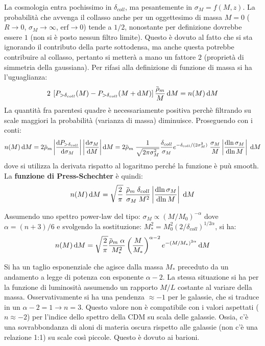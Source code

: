 La cosmologia entra pochissimo in $\delta_{coll}$, ma pesantemente in $\sigma_M=f(M,z)$. La probabilità che avvenga il collasso anche per un oggettesimo di massa $M= 0$ ($R\to 0$, $\sigma_M \to \infty$, $\mathrm{erf}\to 0$) tende a $1/2$, nonostante per definizione dovrebbe essere $1$ (non si è posto nessun filtro limite). Questo è dovuto al fatto che si sta ignorando il contributo della parte sottodensa, ma anche questa potrebbe contribuire al collasso, pertanto si metterà a mano un fattore $2$ (proprietà di simmetria della gaussiana). Per rifasi alla definizione di funzione di massa si ha l'uguaglianza:
\begin{equation*}
    2\: \left[P_{>\delta_{coll}}(M)-P_{>\delta_{coll}}(M+\d{M})\right]\frac{\overbar{\rho}_m }{M}\d{M}=n(M)\d{M}
\end{equation*}
La quantità fra parentesi quadre è necessariamente positiva perchè filtrando su scale maggiori la probabilità (varianza di massa) diminuisce. Proseguendo con i conti:
\begin{equation*}
    n(M)\d{M}= 2 \overbar{\rho}_m \left\lvert \frac{\d{P_{>\delta_{coll}}}}{\d{\sigma_M}}\right\rvert \left\lvert \frac{\d{\sigma_M}}{\d{M}}\right\rvert \d{M}=2 \overbar{\rho}_m\; \frac{1}{\sqrt{2\pi \sigma_M^2}}\frac{\delta_{coll}}{\sigma_M}e^{-\delta_{coll}/(2\sigma_M^2)}\; \frac{\sigma_M}{M} \left\lvert \frac{\d{\ln \sigma_M}}{\d{\ln M}}\right\rvert \; \d{M}
\end{equation*}
dove si utilizza la derivata rispatto al logaritmo perché la funzione è puù smooth. La \textbf{funzione di Press-Schechter} è quindi:
\begin{equation}
    n(M)\d{M}= \sqrt{\frac{2}{\pi}}  \;\frac{\overbar{\rho}_m\; \delta_{coll}}{\sigma_M\; M^2}\left\lvert \frac{\d{\ln \sigma_M}}{\d{\ln M}}\right\rvert \; \d{M}
\end{equation}

Assumendo uno spettro power-law del tipo: $\sigma_M\propto (M/M_0)^{-\alpha}$ dove $\alpha = (n+3)/6$ e svolgendo la sostituzione: $M_*^2=M_0^2 (2/\delta_{coll})^{1/2\alpha}$, si ha:
\begin{equation}
    n(M)\d{M}= \sqrt{\frac{2}{\pi}} \frac{\overbar{\rho}_m\; \alpha}{M_*^2}\left(\frac{M}{M_*}\right)^{\alpha -2} e^{-(M/M_*)^{2\alpha}}\d{M}
\end{equation}

Si ha un taglio esponenziale che agisce dalla massa $M_*$ preceduto da un andamento a legge di potenza con esponente $\alpha-2$. La stessa situazione si ha per la funzione di luminosità assumendo un rapporto $M/L$ costante al variare della massa. Osservativamente si ha una pendenza $\approx -1$ per le galassie, che si traduce in un $\alpha -2=1 \to n = 3$. Questo valore non è compatibile con i valori aspettati ($n\approx -2$) per l'indice dello spettro della CDM su scala delle galassie. Ossia, c'è una sovrabbondanza di aloni di materia oscura rispetto alle galassie (non c'è una relazione 1:1) su scale così piccole. Questo è dovuto ai barioni.

